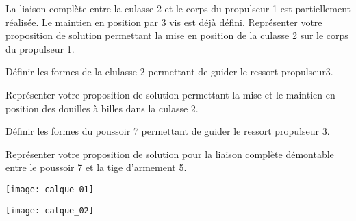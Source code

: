 \documentclass[11pt]{article}
\begin{document}
\UPSTIquestion* La liaison complète entre la culasse 2 et le corps du propulseur 1 est partiellement réalisée. Le maintien en position par 3 vis est déjà défini. Représenter votre proposition de solution permettant la mise en position de la culasse 2 sur le corps du propulseur 1. 
\begin{UPSTIcorrige}
\end{UPSTIcorrige}

\UPSTIquestion Définir les formes de la clulasse 2 permettant de guider le ressort propulseur3.
\begin{UPSTIcorrige}
\end{UPSTIcorrige}

\UPSTIquestion Représenter votre proposition de solution permettant la mise et le maintien en position des douilles à billes dans la culasse 2. 
\begin{UPSTIcorrige}
\end{UPSTIcorrige}

\UPSTIquestion Définir les formes du poussoir 7 permettant de guider le ressort propulseur 3.

 Représenter votre proposition de solution pour la liaison complète démontable entre le poussoir 7 et la tige d'armement 5. 
\begin{UPSTIcorrige}
\end{UPSTIcorrige}


\begin{center}
\texttt{[image: calque\_01]}
\end{center}

\begin{center}
\texttt{[image: calque\_02]}
\end{center}

%

\end{document}
